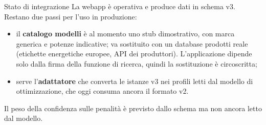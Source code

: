 \begin{warnbox}{Stato di integrazione}
La webapp è operativa e produce dati in schema v3. Restano due passi per l'uso in produzione:
\begin{itemize}[nosep,leftmargin=1.4em]
  \item il \textbf{catalogo modelli} è al momento uno stub dimostrativo, con marca generica e
        potenze indicative; va sostituito con un database prodotti reale (etichette energetiche
        europee, API dei produttori). L'applicazione dipende solo dalla firma della funzione di
        ricerca, quindi la sostituzione è circoscritta;
  \item serve l'\textbf{adattatore} che converta le istanze v3 nei profili letti dal modello di
        ottimizzazione, che oggi consuma ancora il formato v2.
\end{itemize}
Il peso della confidenza sulle penalità è previsto dallo schema ma non ancora letto dal modello.
\end{warnbox}
